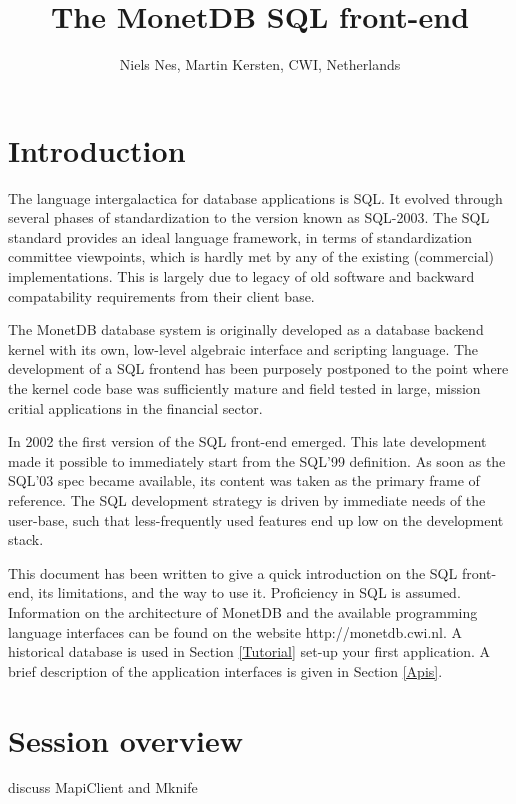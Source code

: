 \documentclass[10pt,twocolumn,fleqn]{article}
\begin{document}
\title{The MonetDB SQL front-end}
\author{ Niels Nes, Martin Kersten, {\small \textsc{CWI}, Netherlands}}
\date{}
\maketitle

\section{Introduction}
The language intergalactica for database applications is SQL. It evolved
through several phases of standardization to the version known as SQL-2003.
The SQL standard provides an ideal language framework, 
in terms of standardization committee viewpoints, 
which is hardly met by any of the existing (commercial) implementations.
This is largely due to legacy of old software and backward compatability
requirements from their client base.
 
The MonetDB database system is originally developed as a database backend
kernel with its own, low-level algebraic interface and scripting language.
The development of a SQL frontend has been purposely postponed to the point
where the kernel code base was sufficiently mature and field tested in
large, mission critial applications in the financial sector.

In 2002 the first version of the SQL front-end emerged. 
This late development made it possible to immediately start from the SQL'99
definition. As soon as the SQL'03 spec became available, its content
was taken as the primary frame of reference.
The SQL development strategy is driven by immediate needs of the
user-base, such that less-frequently used features end up low on
the development stack.

This document has been written to give a quick introduction on the SQL
front-end, its limitations, and the way to use it. 
Proficiency in SQL is assumed.
Information on the architecture of MonetDB and the available programming
language interfaces can be found on the website http://monetdb.cwi.nl.
A historical database is used in Section \ref{Tutorial}
set-up your first application.
A brief description of the application interfaces is given in Section \ref{Apis}.

\section{Session overview}
discuss MapiClient and Mknife
\end{document}
